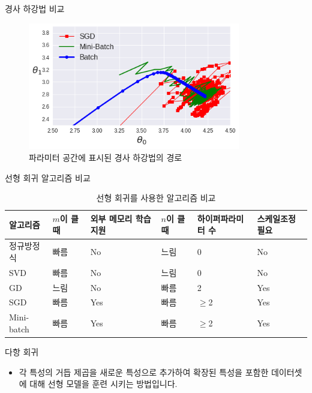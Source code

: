 \documentclass{beamer}
\numberwithin{equation}{section}
\begin{document}

\begin{frame}{경사 하강법 비교}

\begin{figure}
\includegraphics[width=25em]{./images/compare_gradient_descent}
\caption{\label{fig:compare_gradient_descent}파라미터 공간에 표시된 경사 하강법의 경로}
\end{figure}

\end{frame}


\begin{frame}{선형 회귀 알고리즘 비교}

\begin{table}
\centering
\tiny
\begin{tabular}{|l|l|l|l|l|l|}
\hline
알고리즘 & $m$이 클 때 & 외부 메모리 학습 지원 & $n$이 클 때 & 하이퍼파라미터 수 & 스케일조정 필요 \\ \hline \hline
정규방정식 & 빠름 & No & 느림 & 0 & No \\
SVD & 빠름 & No & 느림 & 0 & No \\
GD & 느림 & No & 빠름 & 2 & Yes \\
SGD & 빠름 & Yes & 빠름 & $\geq$2 & Yes \\
Mini-batch & 빠름 & Yes & 빠름 & $\geq$2 & Yes \\
\hline
\end{tabular}
\caption{\label{tab:compare_linear_regression_algorithm}선형 회귀를 사용한 알고리즘 비교}
\end{table}
    
\end{frame}


\begin{frame}{다항 회귀}

\begin{itemize}
\item 각 특성의 거듭 제곱을 새로운 특성으로 추가하여 확장된 특성을 포함한 데이터셋에 대해 선형 모델을 훈련 시키는 방법입니다.
\end{itemize}

\vskip 1cm



\end{frame}
\end{document}
